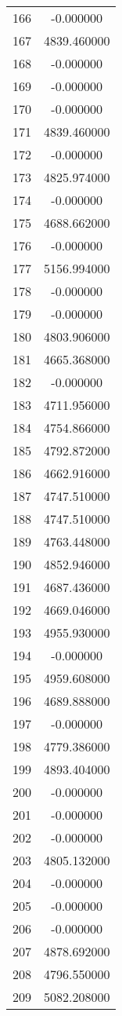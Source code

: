 \documentclass[12pt]{article}
\begin{document}
\begin{longtable}{@{}cc@{}}
166 & -0.000000 \\
167 & 4839.460000 \\
168 & -0.000000 \\
169 & -0.000000 \\
170 & -0.000000 \\
171 & 4839.460000 \\
172 & -0.000000 \\
173 & 4825.974000 \\
174 & -0.000000 \\
175 & 4688.662000 \\
176 & -0.000000 \\
177 & 5156.994000 \\
178 & -0.000000 \\
179 & -0.000000 \\
180 & 4803.906000 \\
181 & 4665.368000 \\
182 & -0.000000 \\
183 & 4711.956000 \\
184 & 4754.866000 \\
185 & 4792.872000 \\
186 & 4662.916000 \\
187 & 4747.510000 \\
188 & 4747.510000 \\
189 & 4763.448000 \\
190 & 4852.946000 \\
191 & 4687.436000 \\
192 & 4669.046000 \\
193 & 4955.930000 \\
194 & -0.000000 \\
195 & 4959.608000 \\
196 & 4689.888000 \\
197 & -0.000000 \\
198 & 4779.386000 \\
199 & 4893.404000 \\
200 & -0.000000 \\
201 & -0.000000 \\
202 & -0.000000 \\
203 & 4805.132000 \\
204 & -0.000000 \\
205 & -0.000000 \\
206 & -0.000000 \\
207 & 4878.692000 \\
208 & 4796.550000 \\
209 & 5082.208000 \\

\end{longtable}
\end{document}
